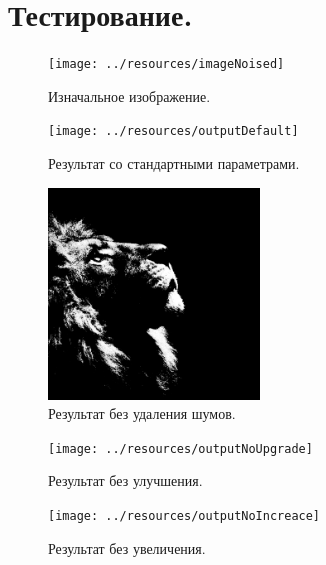 \newpage


\section{Тестирование.}

\begin{figure}[ht]
    \begin{center}
        \texttt{[image: ../resources/imageNoised]}
    \end{center}
    \caption{Изначальное изображение.}
\end{figure}

\begin{figure}[ht]
    \begin{center}
        \texttt{[image: ../resources/outputDefault]}
    \end{center}
    \caption{Результат со стандартными параметрами.}
\end{figure}

\begin{figure}[ht]
    \begin{center}
        \includegraphics[width=0.5\textwidth]{../resources/outputNoDenoise}
    \end{center}
    \caption{Результат без удаления шумов.}
\end{figure}

\begin{figure}[ht]
    \begin{center}
        \texttt{[image: ../resources/outputNoUpgrade]}
    \end{center}
    \caption{Результат без улучшения.}
\end{figure}

\begin{figure}[ht]
    \begin{center}
        \texttt{[image: ../resources/outputNoIncreace]}
    \end{center}
    \caption{Результат без увеличения.}
\end{figure}

